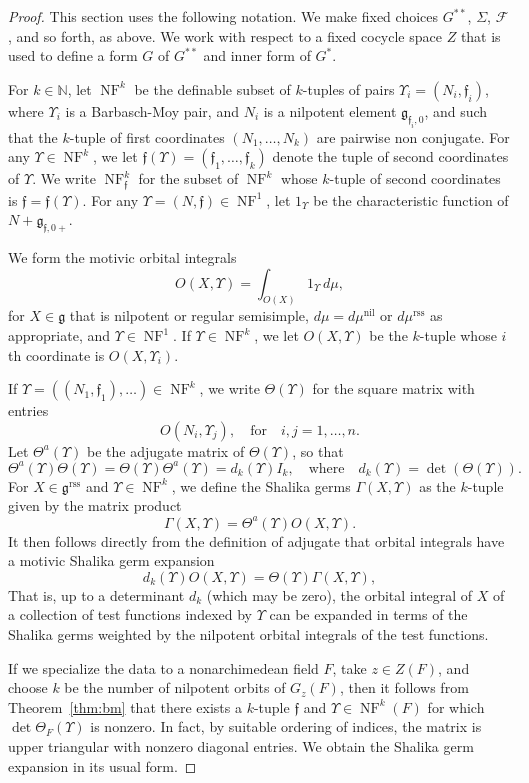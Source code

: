 \documentclass[12pt]{amsart}
\newcommand{\op}[1]{\operatorname{#1}}
\newcommand{\ring}[1]{{\mathbb #1}}
\def\NF{\op{NF}}
\def\Y{\Upsilon}
\def\s{{\mathfrak{f}}}
\newcommand{\cF}{\mathcal{F}}
\newcommand{\fg}{\mathfrak{g}}
\newcommand{\reg}{\mathrm{rss}}
\theoremstyle{plain}
\theoremstyle{definition}
\begin{document}
\begin{proof}
This section uses the following notation.  We make fixed choices
$G^{**}$, $\Sigma$, $\cF$, and so forth, as above.
We work with respect to a fixed cocycle space $Z$ that is used to
define a form $G$ of $G^{**}$ and inner form of $G^*$.

For $k\in \ring{N}$, let $\NF^k$ be the definable subset of $k$-tuples
of pairs $\Y_i=(N_i,\s_i)$, where $\Y_i$ is a Barbasch-Moy pair, and
$N_i$ is a nilpotent element $\fg_{\s_i,0}$, and such that the
$k$-tuple of first coordinates $(N_1,\ldots,N_k)$ are pairwise non
conjugate.  For any $\Y\in \NF^k$, we let $\s(\Y)=(\s_1,\ldots,\s_k)$
denote the tuple of second coordinates of $\Y$.  We write $\NF^k_\s$
for the subset of $\NF^k$ whose $k$-tuple of second coordinates is 
$\s=\s(\Y)$.  For any $\Y=(N,\s)\in \NF^1$, let $1_\Y$ be the
characteristic function of $N+\fg_{\s,0+}$.

We form the motivic orbital integrals
\[
O(X,\Y) = \int_{O(X)} 1_{\Y} \,d\mu,
\]
for $X\in\fg$ that is nilpotent or regular semisimple,
$d\mu=d\mu^{\op{nil}}$ or $d\mu^\reg$ as appropriate, and $\Y\in
\NF^1$.  If $\Y\in \NF^k$, we let $O(X,\Y)$ be the $k$-tuple whose
$i$th coordinate is $O(X,\Y_i)$.

If $\Y=((N_1,\s_1),\ldots)\in \NF^k$, we write $\Theta(\Y)$ for the
square matrix with entries
\[
O(N_i,\Y_j),\quad\text{for}\quad i,j=1,\ldots,n.
\]
Let $\Theta^a(\Y)$ be the adjugate matrix of $\Theta(\Y)$, so that
\[
\Theta^a(\Y) \Theta(\Y) = \Theta(\Y) \Theta^a(\Y) = d_k(\Y)I_k,\quad 
\text{where}\quad d_k(\Y)=\det (\Theta(\Y)). 
\]
For $X\in \fg^\reg$ and $\Y\in \NF^k$, we define the Shalika germs
$\Gamma(X,\Y)$ as the $k$-tuple given by the matrix product
\[
\Gamma (X,\Y) = \Theta^a (\Y) O(X,\Y).
\]
It then follows directly from the
definition of adjugate that orbital integrals have a motivic Shalika
germ expansion
\[
d_k(\Y) O(X,\Y) = \Theta(\Y)\Gamma(X,\Y),
\]
That is, up to a determinant $d_k$ (which may be zero), the orbital
integral of $X$ of a collection of test functions indexed by $\Y$ can
be expanded in terms of the Shalika germs weighted by the nilpotent
orbital integrals of the test functions.


If we specialize the data to a nonarchimedean field $F$, take $z\in
Z(F)$, and choose $k$ be the number of nilpotent orbits of $G_z(F)$,
then it follows from Theorem~\ref{thm:bm} that there exists a
$k$-tuple $\s$ and $\Y\in \NF^k(F)$ for which $\det\Theta_F(\Y)$ is
nonzero. In fact, by suitable ordering of indices, the matrix is upper
triangular with nonzero diagonal entries.  We obtain the Shalika germ
expansion in its usual form.
\end{proof}
\end{document}
